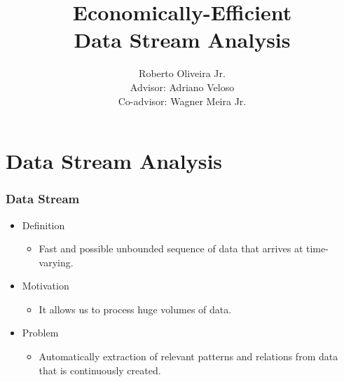 \documentclass[14pt]{beamer}
\title{Economically-Efficient\\Data Stream Analysis}
\author{\small{Roberto Oliveira Jr.\\Advisor: Adriano Veloso \\Co-advisor: Wagner Meira Jr.}}
\institute{Computer Science Dept - UFMG - Brazil}
\date{}
\begin{document}
\begin{frame}
\titlepage
\end{frame}

\section{Data Stream Analysis}

\begin{frame}\frametitle{Data Stream}

\begin{itemize}
\item Definition
\begin{itemize}
\item Fast and possible unbounded sequence of data that arrives at time-varying.
\end{itemize}
\item Motivation
\begin{itemize}
\item It allows us to process huge volumes of data.
\end{itemize}
\end{itemize}
\begin{itemize}
\item Problem
\begin{itemize}
\item Automatically extraction of relevant patterns and relations from data that is continuously created.
\end{itemize}
\end{itemize}

\end{frame}




\end{document}
